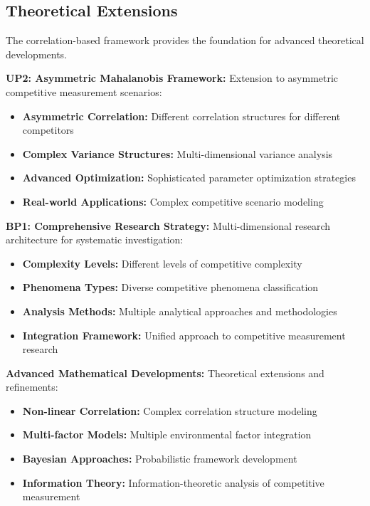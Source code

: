 \subsection{Theoretical Extensions}

The correlation-based framework provides the foundation for advanced theoretical developments.

\textbf{UP2: Asymmetric Mahalanobis Framework:}
Extension to asymmetric competitive measurement scenarios:
\begin{itemize}
    \item \textbf{Asymmetric Correlation:} Different correlation structures for different competitors
    \item \textbf{Complex Variance Structures:} Multi-dimensional variance analysis
    \item \textbf{Advanced Optimization:} Sophisticated parameter optimization strategies
    \item \textbf{Real-world Applications:} Complex competitive scenario modeling
\end{itemize}

\textbf{BP1: Comprehensive Research Strategy:}
Multi-dimensional research architecture for systematic investigation:
\begin{itemize}
    \item \textbf{Complexity Levels:} Different levels of competitive complexity
    \item \textbf{Phenomena Types:} Diverse competitive phenomena classification
    \item \textbf{Analysis Methods:} Multiple analytical approaches and methodologies
    \item \textbf{Integration Framework:} Unified approach to competitive measurement research
\end{itemize}

\textbf{Advanced Mathematical Developments:}
Theoretical extensions and refinements:
\begin{itemize}
    \item \textbf{Non-linear Correlation:} Complex correlation structure modeling
    \item \textbf{Multi-factor Models:} Multiple environmental factor integration
    \item \textbf{Bayesian Approaches:} Probabilistic framework development
    \item \textbf{Information Theory:} Information-theoretic analysis of competitive measurement
\end{itemize}


